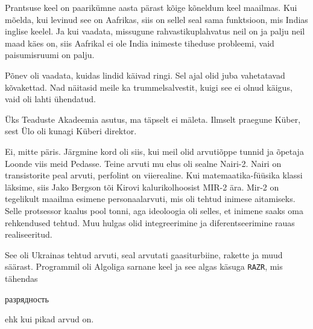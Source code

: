
Prantsuse keel on paarikümne aasta pärast
kõige kõneldum keel maailmas. Kui mõelda, kui levinud see on Aafrikas, siis on sellel seal sama funktsioon, mis Indias inglise keelel. Ja 
kui 
vaadata, missugune rahvastikuplahvatus neil on ja palju neil maad käes on, siis 
Aafrikal ei ole India inimeste tiheduse probleemi, vaid paisumisruumi on
palju.


Põnev oli vaadata, kuidas lindid käivad ringi. Sel ajal olid juba 
vahetatavad kõvakettad. Nad näitasid meile ka trummelsalvestit, kuigi see 
ei olnud käigus, vaid oli lahti ühendatud.


Üks Teaduste Akadeemia asutus, ma täpselt ei mäleta. Ilmselt 
praegune Küber, sest Ülo oli kunagi Küberi 
direktor.


Ei, mitte päris. Järgmine kord oli siis, kui meil olid arvutiõppe tunnid 
ja õpetaja Loonde viis meid Pedasse. 
Teine arvuti mu elus oli sealne Nairi-2. Nairi on 
transistorite peal arvuti, perfolint on viierealine. Kui 
matemaatika-füüsika klassi läksime, siis Jako Bergson tõi 
Kirovi kalurikolhoosist MIR-2 
ära. Mir-2 on tegelikult maailma esimene personaalarvuti, mis oli tehtud inimese aitamiseks. Selle protsessor kaalus pool 
tonni, aga ideoloogia oli selles, et inimene saaks 
oma rehkendused tehtud. Muu hulgas olid integreerimine ja diferentseerimine 
rauas realiseeritud.


See oli Ukrainas tehtud arvuti, seal arvutati gaasiturbiine, 
rakette ja muud säärast. Programmil oli 
Algoliga sarnane keel ja see algas käsuga \verb|RAZR|, mis tähendas 
\begin{russian}разрядность\end{russian} ehk kui pikad arvud on. 


